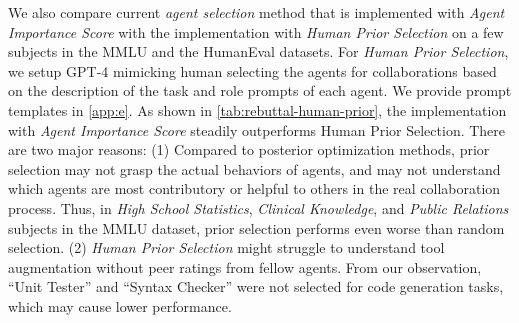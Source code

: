 \documentclass{article} %
\begin{document}
We also compare current \textit{agent selection} method that is implemented with \textit{Agent Importance Score} with the implementation with \textit{Human Prior Selection} on a few subjects in the MMLU and the HumanEval datasets. For \textit{Human Prior Selection}, we setup GPT-4 mimicking human selecting the agents for collaborations based on the description of the task and role prompts of each agent. We provide prompt templates in \cref{app:e}. As shown in \cref{tab:rebuttal-human-prior}, the implementation with \textit{Agent Importance Score} steadily outperforms Human Prior Selection. There are two major reasons: (1) Compared to posterior optimization methods, prior selection may not grasp the actual behaviors of agents, and may not understand which agents are most contributory or helpful to others in the real collaboration process. Thus, in \textit{High School Statistics}, \textit{Clinical Knowledge}, and \textit{Public Relations} subjects in the MMLU dataset, prior selection performs even worse than random selection. (2) \textit{Human Prior Selection} might struggle to understand tool augmentation without peer ratings from fellow agents. From our observation, ``Unit Tester'' and ``Syntax Checker'' were not selected for code generation tasks, which may cause lower performance.
\end{document}

